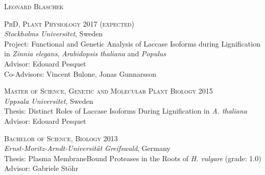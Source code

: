 \documentclass[11pt]{article}
\begin{document}
	\pagestyle{empty}
\begin{center}
	\huge{\textsc{Leonard Blaschek}}
	\vspace*{1cm}
\end{center}

\vspace{0.2cm}

\textsc{\large{PhD, Plant Physiology}} \hfill \textsc{\large{2017 \textnormal{(expected)}}} \\
\hspace*{24pt}\textit{Stockholms Universitet}, Sweden \\
\hspace*{24pt}Project: Functional and Genetic Analysis of Laccase Isoforms during Lignification \\
\hspace*{62pt}in \textit{Zinnia elegans}, \textit{Arabidopsis thaliana} and \textit{Populus}\\
\hspace*{24pt}Advisor: Edouard Pesquet \\
\hspace*{24pt}Co-Advisors: Vincent Bulone, Jonas Gunnarsson
\vspace{0.2cm}

\textsc{\large{Master of Science, Genetic and Molecular Plant Biology}} \hfill \textsc{\large{2015}} \\
\hspace*{24pt}\textit{Uppsala Universitet}, Sweden \\
\hspace*{24pt}Thesis: Distinct Roles of Laccase Isoforms During Lignification in \textit{A. thaliana}\\
\hspace*{24pt}Advisor: Edouard Pesquet
\vspace{0.2cm}

\textsc{\large{Bachelor of Science, Biology}} \hfill \textsc{\large{2013}} \\
\hspace*{24pt}\textit{Ernst-Moritz-Arndt-Universität Greifswald}, Germany \\
\hspace*{24pt}Thesis: Plasma Membrane\textendash Bound Proteases in the Roots of \textit{H. vulgare} (grade: \textsc{1.0}) \\
\hspace*{24pt}Advisor: Gabriele Stöhr
\vspace{1cm}
\end{document}
